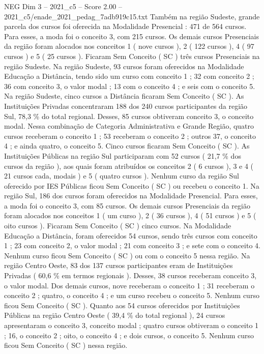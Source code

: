 \begin{textsample}{NEG Dim 3 – 2021\_c5 – Score 2.00 – 2021\_c5/enade\_2021\_pedag\_7adb919c15.txt}
Também na região Sudeste, grande parcela dos cursos foi oferecida na Modalidade Presencial : 471 de 564 cursos.
Para esses, a moda foi o conceito 3, com 215 cursos.
Os demais cursos Presenciais da região foram alocados nos conceitos 1 ( nove cursos ), 2 ( 122 cursos ), 4 ( 97 cursos ) e 5 ( 25 cursos ).
Ficaram Sem Conceito ( SC ) três cursos Presenciais na região Sudeste.
Na região Sudeste, 93 cursos foram oferecidos na Modalidade Educação a Distância, tendo sido um curso com conceito 1 ; 32 com conceito 2 ; 36 com conceito 3, o valor modal ; 13 com o conceito 4 ; e seis com o conceito 5.
Na região Sudeste, cinco cursos a Distância ficaram Sem Conceito ( SC ).
As Instituições Privadas concentraram 188 dos 240 cursos participantes da região Sul, 78,3 \% do total regional.
Desses, 85 cursos obtiveram conceito 3, o conceito modal.
Nessa combinação de Categoria Administrativa e Grande Região, quatro cursos receberam o conceito 1 ; 53 receberam o conceito 2 ; outros 37, o conceito 4 ; e ainda quatro, o conceito 5.
Cinco cursos ficaram Sem Conceito ( SC ).
As Instituições Públicas na região Sul participaram com 52 cursos ( 21,7 \% dos cursos da região ), aos quais foram atribuídos os conceitos 2 ( 6 cursos ), 3 e 4 ( 21 cursos cada, modais ) e 5 ( quatro cursos ).
Nenhum curso da região Sul oferecido por IES Públicas ficou Sem Conceito ( SC ) ou recebeu o conceito 1.
Na região Sul, 186 dos cursos foram oferecidos na Modalidade Presencial.
Para esses, a moda foi o conceito 3, com 85 cursos.
Os demais cursos Presenciais da região foram alocados nos conceitos 1 ( um curso ), 2 ( 36 cursos ), 4 ( 51 cursos ) e 5 ( oito cursos ).
Ficaram Sem Conceito ( SC ) cinco cursos.
Na Modalidade Educação a Distância, foram oferecidos 54 cursos, sendo três cursos com conceito 1 ; 23 com conceito 2, o valor modal ; 21 com conceito 3 ; e sete com o conceito 4.
Nenhum curso ficou Sem Conceito ( SC ) ou com o conceito 5 nessa região.
Na região Centro Oeste, 83 dos 137 cursos participantes eram de Instituições Privadas ( 60,6 \% em termos regionais ).
Desses, 38 cursos receberam conceito 3, o valor modal.
Dos demais cursos, nove receberam o conceito 1 ; 31 receberam o conceito 2 ; quatro, o conceito 4 ; e um curso recebeu o conceito 5.
Nenhum curso ficou Sem Conceito ( SC ).
Quanto aos 54 cursos oferecidos por Instituições Públicas na região Centro Oeste ( 39,4 \% do total regional ), 24 cursos apresentaram o conceito 3, conceito modal ; quatro cursos obtiveram o conceito 1 ; 16, o conceito 2 ; oito, o conceito 4 ; e dois cursos, o conceito 5.
Nenhum curso ficou Sem Conceito ( SC ) nessa região.

\end{textsample}
